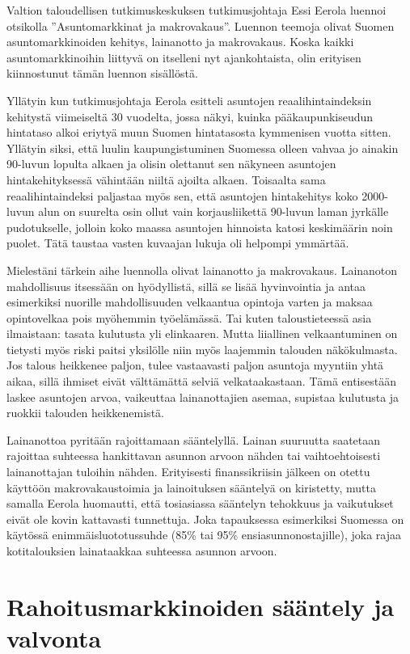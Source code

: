 \documentclass[12pt]{article}
\begin{document}
Valtion taloudellisen tutkimuskeskuksen tutkimusjohtaja Essi Eerola luennoi
otsikolla ''Asuntomarkkinat ja makrovakaus''. Luennon teemoja olivat Suomen
asuntomarkkinoiden kehitys, lainanotto ja makrovakaus. Koska kaikki
asuntomarkkinoihin liittyvä on itselleni nyt ajankohtaista, olin erityisen
kiinnostunut tämän luennon sisällöstä.

Yllätyin kun tutkimusjohtaja Eerola esitteli asuntojen reaalihintaindeksin
kehitystä viimeiseltä 30 vuodelta, jossa näkyi, kuinka pääkaupunkiseudun
hintataso alkoi eriytyä muun Suomen hintatasosta kymmenisen vuotta sitten.
Yllätyin siksi, että luulin kaupungistuminen Suomessa olleen vahvaa jo ainakin
90-luvun lopulta alkaen ja olisin olettanut sen näkyneen asuntojen
hintakehityksessä vähintään niiltä ajoilta alkaen. Toisaalta sama
reaalihintaindeksi paljastaa myös sen, että asuntojen hintakehitys koko
2000-luvun alun on suurelta osin ollut vain korjausliikettä 90-luvun laman
jyrkälle pudotukselle, jolloin koko maassa asuntojen hinnoista katosi
keskimäärin noin puolet. Tätä taustaa vasten kuvaajan lukuja oli helpompi
ymmärtää.

Mielestäni tärkein aihe luennolla olivat lainanotto ja makrovakaus. Lainanoton
mahdollisuus itsessään on hyödyllistä, sillä se lisää hyvinvointia ja antaa
esimerkiksi nuorille mahdollisuuden velkaantua opintoja varten ja maksaa
opintovelkaa pois myöhemmin työelämässä. Tai kuten taloustieteessä asia
ilmaistaan: tasata kulutusta yli elinkaaren. Mutta liiallinen velkaantuminen on
tietysti myös riski paitsi yksilölle niin myös laajemmin talouden näkökulmasta.
Jos talous heikkenee paljon, tulee vastaavasti paljon asuntoja myyntiin yhtä
aikaa, sillä ihmiset eivät välttämättä selviä velkataakastaan. Tämä entisestään
laskee asuntojen arvoa, vaikeuttaa lainanottajien asemaa, supistaa kulutusta ja
ruokkii talouden heikkenemistä.

Lainanottoa pyritään rajoittamaan sääntelyllä. Lainan suuruutta saatetaan
rajoittaa suhteessa hankittavan asunnon arvoon nähden tai vaihtoehtoisesti
lainanottajan tuloihin nähden. Erityisesti finanssikriisin jälkeen on otettu
käyttöön makrovakaustoimia ja lainoituksen sääntelyä on kiristetty, mutta
samalla Eerola huomautti, että tosiasiassa sääntelyn tehokkuus ja vaikutukset
eivät ole kovin kattavasti tunnettuja. Joka tapauksessa esimerkiksi Suomessa on
käytössä enimmäisluototussuhde (85\% tai 95\% ensiasunnonostajille), joka rajaa
kotitalouksien lainataakkaa suhteessa asunnon arvoon.


\newpage
\section{Rahoitusmarkkinoiden sääntely ja valvonta}
\end{document}
